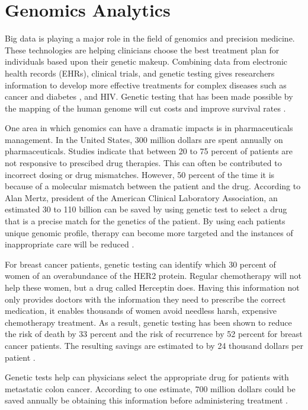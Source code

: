 \documentclass[sigconf]{acmart}
\begin{document}
  
\section{Genomics Analytics}
Big data is playing a major role in the field of genomics and precision medicine. These technologies are helping clinicians choose the best treatment plan for individuals based upon their genetic makeup. Combining data from electronic health records (EHRs), clinical trials, and genetic testing gives researchers information to develop more effective treatments for complex diseases such as cancer and diabetes \cite{www-google-pacient}, and HIV.  Genetic testing that has been made possible by the mapping of the human genome will cut costs and improve survival rates \cite{www-google-geno}.

One area in which genomics can have a dramatic impacts is in pharmaceuticals management. In the United States, 300 million dollars are spent annually on pharmaceuticals. Studies indicate that between 20 to 75 percent of patients are not responsive to prescibed drug therapies.  This can often be contributed to incorrect dosing or drug mismatches. However, 50 percent of the time it is because of a molecular mismatch between the patient and the drug. According to Alan Mertz, president of the American Clinical Laboratory Association, an estimated 30 to 110 billion can be saved by using genetic test to select a drug that is a precise match for the genetics of the patient. By using each patients unique genomic profile, therapy can become more targeted and the instances of inappropriate care will be reduced \cite{www-google-geno}.

For breast cancer patients, genetic testing can identify which 30 percent of women of an overabundance of the HER2 protein. Regular chemotherapy will not help these women, but a drug called Herceptin does. Having this information not only provides doctors with the information they need to prescribe the correct medication, it enables thousands of women avoid needless harsh, expensive chemotherapy treatment.  As a result, genetic testing has been shown to reduce the risk of death by 33 percent and the risk of recurrence by 52 percent for breast cancer patients. The resulting savings are estimated to by 24 thousand dollars per patient \cite{www-google-geno}.

Genetic tests help can physicians select the appropriate drug for patients with metastatic colon cancer. According to one estimate, 700 million dollars could be saved annually be obtaining this information before administering treatment \cite{www-google-geno}.
\end{document}
